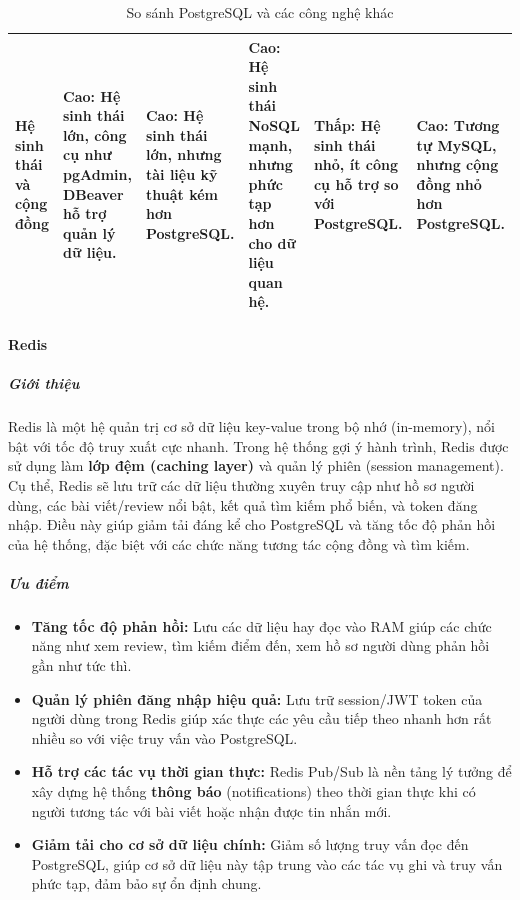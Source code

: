\begin{landscape}
\begin{table}[h!]
\begin{tabularx}{\linewidth}{|l|X|X|X|X|X|}
\hline
\textbf{Hệ sinh thái và cộng đồng} & \textbf{Cao}: Hệ sinh thái lớn, công cụ như pgAdmin, DBeaver hỗ trợ quản lý dữ liệu. & \textbf{Cao}: Hệ sinh thái lớn, nhưng tài liệu kỹ thuật kém hơn PostgreSQL. & \textbf{Cao}: Hệ sinh thái NoSQL mạnh, nhưng phức tạp hơn cho dữ liệu quan hệ. & \textbf{Thấp}: Hệ sinh thái nhỏ, ít công cụ hỗ trợ so với PostgreSQL. & \textbf{Cao}: Tương tự MySQL, nhưng cộng đồng nhỏ hơn PostgreSQL. \\
\hline
\end{tabularx}
\caption{So sánh PostgreSQL và các công nghệ khác}
\end{table}
\end{landscape}

\paragraph{Redis}

\subparagraph{Giới thiệu}
Redis là một hệ quản trị cơ sở dữ liệu key-value trong bộ nhớ (in-memory), nổi bật với tốc độ truy xuất cực nhanh. Trong hệ thống gợi ý hành trình, Redis được sử dụng làm \textbf{lớp đệm (caching layer)} và quản lý phiên (session management). Cụ thể, Redis sẽ lưu trữ các dữ liệu thường xuyên truy cập như hồ sơ người dùng, các bài viết/review nổi bật, kết quả tìm kiếm phổ biến, và token đăng nhập. Điều này giúp giảm tải đáng kể cho PostgreSQL và tăng tốc độ phản hồi của hệ thống, đặc biệt với các chức năng tương tác cộng đồng và tìm kiếm.

\subparagraph{Ưu điểm}
\begin{itemize}
    \item \textbf{Tăng tốc độ phản hồi:} Lưu các dữ liệu hay đọc vào RAM giúp các chức năng như xem review, tìm kiếm điểm đến, xem hồ sơ người dùng phản hồi gần như tức thì.
    \item \textbf{Quản lý phiên đăng nhập hiệu quả:} Lưu trữ session/JWT token của người dùng trong Redis giúp xác thực các yêu cầu tiếp theo nhanh hơn rất nhiều so với việc truy vấn vào PostgreSQL.
    \item \textbf{Hỗ trợ các tác vụ thời gian thực:} Redis Pub/Sub là nền tảng lý tưởng để xây dựng hệ thống \textbf{thông báo} (notifications) theo thời gian thực khi có người tương tác với bài viết hoặc nhận được tin nhắn mới.
    \item \textbf{Giảm tải cho cơ sở dữ liệu chính:} Giảm số lượng truy vấn đọc đến PostgreSQL, giúp cơ sở dữ liệu này tập trung vào các tác vụ ghi và truy vấn phức tạp, đảm bảo sự ổn định chung.
\end{itemize}

